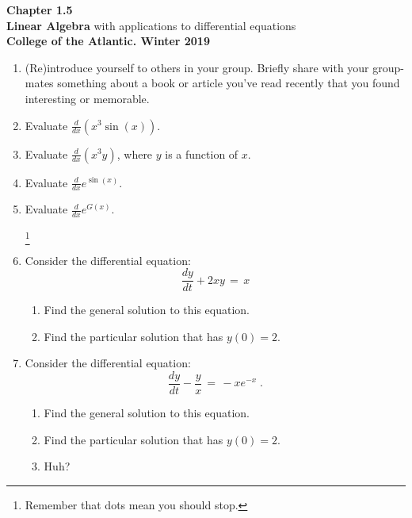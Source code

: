 \documentclass[12pt]{article}
\begin{document}
\pagestyle{empty}
\begin{center}
{\Large {\bf Chapter 1.5}}\\
\medskip
{\large {\bf Linear Algebra} with applications to differential
  equations}\\ 
\medskip
{\bf College of the Atlantic.  Winter 2019}
\end{center}
\medskip

\begin{enumerate}
\setlength{\itemsep}{3mm}

\item (Re)introduce yourself to others in your group.  Briefly share
  with your group-mates something about a book or article you've read
  recently that you found interesting or memorable.  

\item Evaluate $\frac{d}{dx} (x^3\sin(x))$.

\item Evaluate $\frac{d}{dx} (x^3y)$, where $y$ is a function of $x$.

\item Evaluate $\frac{d}{dx} e^{\sin(x)}$.

\item Evaluate $\frac{d}{dx} e^{G(x)}$.
  
\dotfill\footnote{Remember that dots mean you should stop.}


\item Consider the differential equation:
  \begin{equation}
    \frac{dy}{dt} +2xy \, = \, x
  \end{equation}
  \begin{enumerate}
    \item Find the general solution to this equation.
    \item Find the particular solution that has $y(0) = 2$.
  \end{enumerate}

  \item Consider the differential equation:
  \begin{equation}
    \frac{dy}{dt} - \frac{y}{x} \, = \, -xe^{-x} \;.
  \end{equation}
  \begin{enumerate}
    \item Find the general solution to this equation.
    \item Find the particular solution that has $y(0) = 2$.
    \item Huh? 
  \end{enumerate}
  
\end{enumerate}
\end{document}
